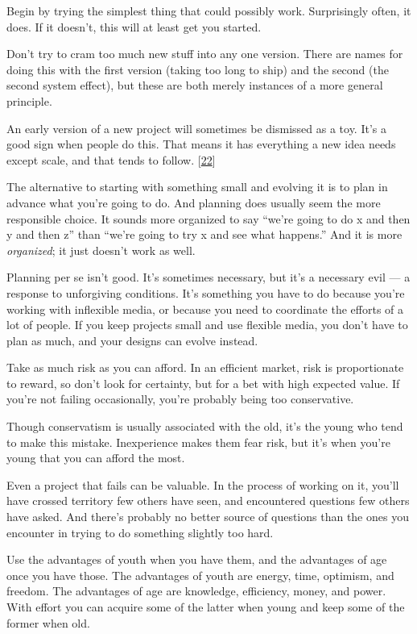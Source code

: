 Begin by trying the simplest thing that could possibly work.
Surprisingly often, it does. If it doesn't, this will at least get you
started.

Don't try to cram too much new stuff into any one version. There are
names for doing this with the first version (taking too long to ship)
and the second (the second system effect), but these are both merely
instances of a more general principle.

An early version of a new project will sometimes be dismissed as a toy.
It's a good sign when people do this. That means it has everything a new
idea needs except scale, and that tends to follow.
{[}\hyperref[f22n]{22}{]}

The alternative to starting with something small and evolving it is to
plan in advance what you're going to do. And planning does usually seem
the more responsible choice. It sounds more organized to say ``we're
going to do x and then y and then z'' than ``we're going to try x and
see what happens.'' And it is more \emph{organized}; it just doesn't
work as well.

Planning per se isn't good. It's sometimes necessary, but it's a
necessary evil --- a response to unforgiving conditions. It's something
you have to do because you're working with inflexible media, or because
you need to coordinate the efforts of a lot of people. If you keep
projects small and use flexible media, you don't have to plan as much,
and your designs can evolve instead.

Take as much risk as you can afford. In an efficient market, risk is
proportionate to reward, so don't look for certainty, but for a bet with
high expected value. If you're not failing occasionally, you're probably
being too conservative.

Though conservatism is usually associated with the old, it's the young
who tend to make this mistake. Inexperience makes them fear risk, but
it's when you're young that you can afford the most.

Even a project that fails can be valuable. In the process of working on
it, you'll have crossed territory few others have seen, and encountered
questions few others have asked. And there's probably no better source
of questions than the ones you encounter in trying to do something
slightly too hard.

Use the advantages of youth when you have them, and the advantages of
age once you have those. The advantages of youth are energy, time,
optimism, and freedom. The advantages of age are knowledge, efficiency,
money, and power. With effort you can acquire some of the latter when
young and keep some of the former when old.

